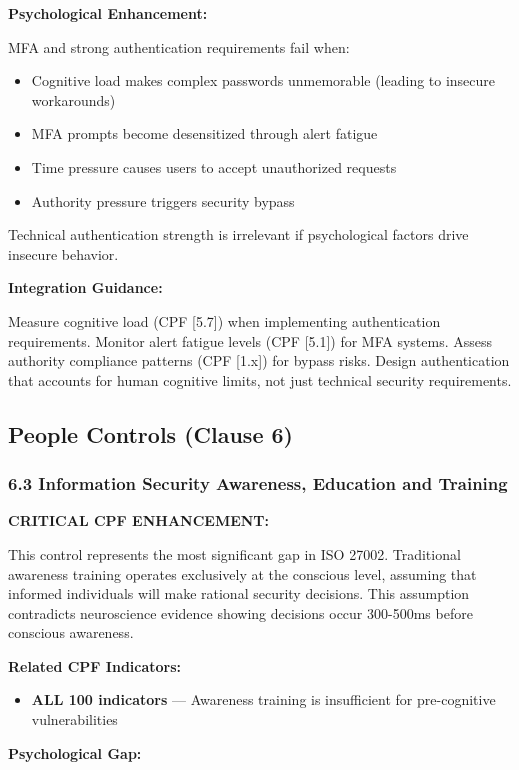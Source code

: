 \documentclass[11pt,a4paper]{article}
\begin{document}
\textbf{Psychological Enhancement:}

MFA and strong authentication requirements fail when:
\begin{itemize}
\item Cognitive load makes complex passwords unmemorable (leading to insecure workarounds)
\item MFA prompts become desensitized through alert fatigue
\item Time pressure causes users to accept unauthorized requests
\item Authority pressure triggers security bypass
\end{itemize}

Technical authentication strength is irrelevant if psychological factors drive insecure behavior.

\textbf{Integration Guidance:}

Measure cognitive load (CPF [5.7]) when implementing authentication requirements. Monitor alert fatigue levels (CPF [5.1]) for MFA systems. Assess authority compliance patterns (CPF [1.x]) for bypass risks. Design authentication that accounts for human cognitive limits, not just technical security requirements.

\subsection{People Controls (Clause 6)}

\subsubsection{6.3 Information Security Awareness, Education and Training}

\textbf{CRITICAL CPF ENHANCEMENT:}

This control represents the most significant gap in ISO 27002. Traditional awareness training operates exclusively at the conscious level, assuming that informed individuals will make rational security decisions. This assumption contradicts neuroscience evidence showing decisions occur 300-500ms before conscious awareness.

\textbf{Related CPF Indicators:}
\begin{itemize}
\item \textbf{ALL 100 indicators} --- Awareness training is insufficient for pre-cognitive vulnerabilities
\end{itemize}

\textbf{Psychological Gap:}
\end{document}
